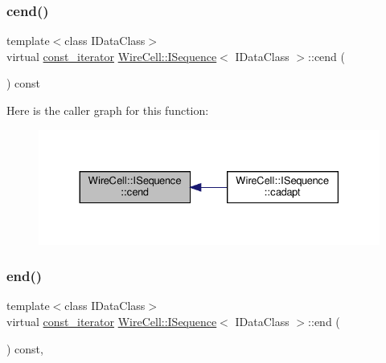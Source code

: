 \subsubsection{\texorpdfstring{cend()}{cend()}}
{\footnotesize\ttfamily template$<$class I\+Data\+Class$>$ \\
virtual \hyperlink{class_wire_cell_1_1_i_sequence_a70e983c18db65df4337838592fa9fd9d}{const\+\_\+iterator} \hyperlink{class_wire_cell_1_1_i_sequence}{Wire\+Cell\+::\+I\+Sequence}$<$ I\+Data\+Class $>$\+::cend (\begin{DoxyParamCaption}{ }\end{DoxyParamCaption}) const\hspace{0.3cm}{\ttfamily [pure virtual]}}

Here is the caller graph for this function\+:
\nopagebreak
\begin{figure}[H]
\begin{center}
\leavevmode
\includegraphics[width=330pt]{class_wire_cell_1_1_i_sequence_a0707bb6db2b2cf79cbf7a6e3c05a7e14_icgraph}
\end{center}
\end{figure}
\mbox{\label{class_wire_cell_1_1_i_sequence_afc9e30f4829c0b1ac9b8006f6eefd411}} 
\subsubsection{\texorpdfstring{end()}{end()}\hspace{0.1cm}{\footnotesize\ttfamily [1/2]}}
{\footnotesize\ttfamily template$<$class I\+Data\+Class$>$ \\
virtual \hyperlink{class_wire_cell_1_1_i_sequence_a70e983c18db65df4337838592fa9fd9d}{const\+\_\+iterator} \hyperlink{class_wire_cell_1_1_i_sequence}{Wire\+Cell\+::\+I\+Sequence}$<$ I\+Data\+Class $>$\+::end (\begin{DoxyParamCaption}{ }\end{DoxyParamCaption}) const\hspace{0.3cm}{\ttfamily [inline]}, {\ttfamily [virtual]}}



